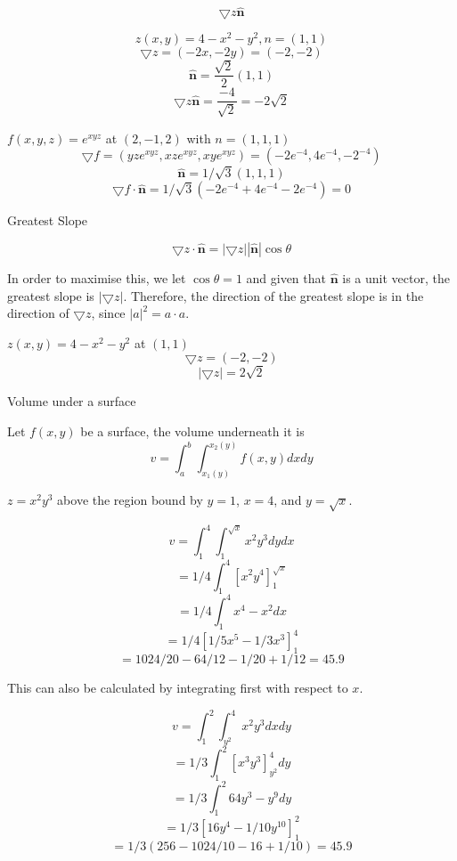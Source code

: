 \documentclass[a4paper,10pt]{article}
\begin{document}
\[ \bigtriangledown z \mathbf{\hat{n}} \]

\begin{ex}
	\[ z(x,y) = 4 - x^2 - y^2, n = (1,1) \]
	\[ \bigtriangledown z = (-2x, -2y) = (-2, -2) \]
	\[ \mathbf{\hat{n}} = \frac{\sqrt{2}}{2} (1,1) \]
	\[ \bigtriangledown z \mathbf{\hat{n}} = \frac{-4}{\sqrt{2}}
	   = -2 \sqrt{2} \]
\end{ex}

\begin{ex}
	$f(x,y,z) = e^{xyz}$ at $(2,-1,2)$ with $n = (1,1,1)$
	\[ \bigtriangledown f = (yze^{xyz}, xze^{xyz}, xye^{xyz})
		= (-2e^{-4}, 4e^{-4}, -2^{-4}) \]
	\[ \mathbf{\hat{n}} = 1/\sqrt{3}(1,1,1) \]
	\[ \bigtriangledown f \cdot \mathbf{\hat{n}} = 1/\sqrt{3}(-2e^{-4} +
	4e^{-4} - 2e^{-4}) = 0 \]
\end{ex}

Greatest Slope

\[ \bigtriangledown z \cdot \mathbf{\hat{n}} = |\bigtriangledown
z||\mathbf{\hat{n}}|\cos \theta \]

In order to maximise this, we let $\cos \theta = 1$ and given that
$\mathbf{\hat{n}}$ is a unit vector, the greatest slope is $|\bigtriangledown
z|$. Therefore, the direction of the greatest slope is in the direction of
$\bigtriangledown z$, since $|a|^2 = a \cdot a$.

\begin{ex}
	$z(x,y) = 4 - x^2 - y^2$ at $(1,1)$
	\[ \bigtriangledown z = (-2,-2) \]
	\[ |\bigtriangledown z| = 2\sqrt{2} \]
\end{ex}

Volume under a surface

Let $f(x,y)$ be a surface, the volume underneath it is
\[ v = \int_a^b \int_{x_1(y)}^{x_2(y)} f(x,y) dx dy \]

\begin{ex}
	$z = x^2y^3$ above the region bound by $y=1$, $x=4$, and $y=\sqrt{x}$.

	\[ v = \int_1^4 \int_1^{\sqrt{x}} x^2y^3 dy dx \]
	\[ = 1/4 \int_1^4 \left[ x^2y^4 \right]_1^{\sqrt{x}} \]
	\[ = 1/4 \int_1^4 x^4 - x^2 dx \]
	\[ = 1/4 \left[ 1/5 x^5 - 1/3 x^3 \right]_1^4 \]
	\[ = 1024/20 - 64/12 - 1/20 + 1/12 = 45.9 \]

	This can also be calculated by integrating first with respect to $x$.

	\[ v = \int_1^2 \int_{y^2}^4 x^2y^3 dxdy \]
	\[ = 1/3 \int_1^2 \left [x^3y^3 \right]_{y^2}^4 dy \]
	\[ = 1/3 \int_1^2 64y^3 - y^9 dy \]
	\[ = 1/3 \left[ 16y^4 - 1/10 y^10 \right]_1^2 \]
	\[ = 1/3 \left( 256 - 1024/10 - 16 + 1/10 \right) = 45.9 \]

\end{ex}
\end{document}
